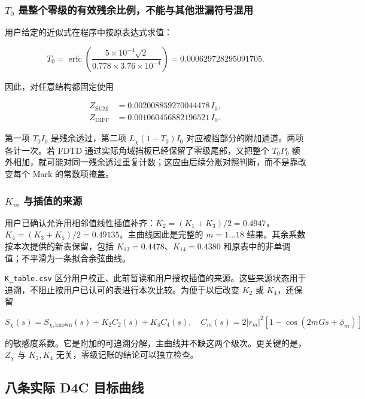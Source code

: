 \documentclass[
  chinese,
  UTF8,
  a4paper,
  11pt]{ctexart}
\begin{document}
\subsubsection{\texorpdfstring{\(T_0\)
是整个零级的有效残余比例，不能与其他泄漏符号混用}{T\_0 是整个零级的有效残余比例，不能与其他泄漏符号混用}}\label{t_0-ux662fux6574ux4e2aux96f6ux7ea7ux7684ux6709ux6548ux6b8bux4f59ux6bd4ux4f8bux4e0dux80fdux4e0eux5176ux4ed6ux6cc4ux6f0fux7b26ux53f7ux6df7ux7528}

用户给定的近似式在程序中按原表达式求值：

\[
T_0=\operatorname{erfc}\left(
\frac{5\times10^{-4}\sqrt2}{0.778\times3.76\times10^{-4}}
\right)=0.000629728295091705.
\]

因此，对任意结构都固定使用

\[
\begin{aligned}
Z_{\mathrm{SUM}}&=0.002008859270044478\,I_0,\\
Z_{\mathrm{DIFF}}&=0.001060456882196521\,I_0.
\end{aligned}
\]

第一项 \(T_0 I_0\) 是残余透过，第二项 \(L_\chi(1-T_0)I_0\)
对应被挡部分的附加通道。两项各计一次。若 FDTD
通过实际角域挡板已经保留了零级尾部，又把整个 \(T_0P_0\)
额外相加，就可能对同一残余透过重复计数；这应由后续分账对照判断，而不是靠改变每个
Mark 的常数项掩盖。

\subsubsection{\texorpdfstring{\(K_m\)
与插值的来源}{K\_m 与插值的来源}}\label{k_m-ux4e0eux63d2ux503cux7684ux6765ux6e90}

用户已确认允许用相邻值线性插值补齐：\(K_2=(K_1+K_3)/2=0.4947\)，\(K_4=(K_3+K_5)/2=0.49135\)。主曲线因此是完整的
\(m=1\ldots18\) 结果。其余系数按本次提供的新表保留，包括
\(K_{13}=0.4478\)、\(K_{14}=0.4380\)
和原表中的非单调值；不平滑为一条拟合余弦曲线。

\texttt{K\_table.csv}
区分用户校正、此前暂读和用户授权插值的来源。这些来源状态用于追溯，不阻止按用户已认可的表进行本次比较。为便于以后改变
\(K_2\) 或 \(K_4\)，还保留

\[
S_\chi(s)=S_{\chi,\mathrm{known}}(s)+K_2C_2(s)+K_4C_4(s),
\quad C_m(s)=2|r_m|^2[1-\cos(2mGs+\phi_m)]
\]

的敏感度系数。它是附加的可追溯分解，主曲线并不缺这两个级次。更关键的是，\(Z_\chi\)
与 \(K_2,K_4\) 无关，零级记账的结论可以独立检查。

\subsection{八条实际 D4C
目标曲线}\label{ux516bux6761ux5b9eux9645-d4c-ux76eeux6807ux66f2ux7ebf}
\end{document}

